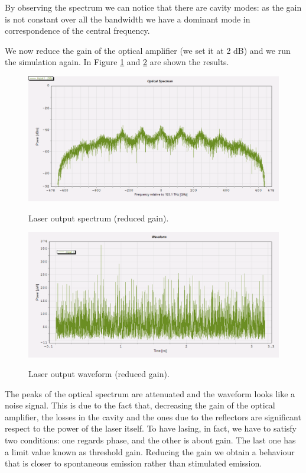 \documentclass[a4paper,10pt]{report}
\begin{document}
By observing the spectrum we can notice that there are cavity modes: as the gain is not constant over all the bandwidth we have a dominant mode
in correspondence of the central frequency.


We now reduce the gain of the optical amplifier (we set it at 2 dB) and we run the simulation again.
In Figure \ref{Tx1_13} and \ref{Tx1_14} are shown the results.

\begin{figure}[!ht]
  \centering
  \includegraphics[width=12cm]{Tx1_13.png}\\
  \caption{Laser output spectrum (reduced gain).}
  \label{Tx1_13}
\end{figure}

\begin{figure}[!ht]
  \centering
  \includegraphics[width=12cm]{Tx1_14.png}\\
  \caption{Laser output waveform (reduced gain).}
  \label{Tx1_14}
\end{figure}

The peaks of the optical spectrum are attenuated and the waveform looks like a noise signal.
This is due to the fact that, decreasing the gain of the
optical amplifier, the losses in the cavity and the ones due to the reflectors are significant respect to the power of the laser itself.
To have lasing, in fact, we have to satisfy two conditions: one regards phase, and the other is about gain. The last one has a limit value known as
threshold gain. Reducing the gain we obtain a behaviour that is closer to spontaneous emission rather than stimulated emission.
\end{document}
